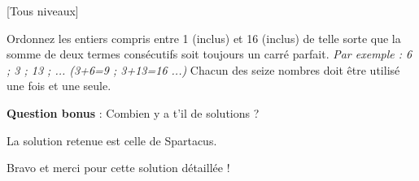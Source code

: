 
%
[Tous niveaux]

\begin{center}
\end{center}

Ordonnez les entiers compris entre 1 (inclus) et 16 (inclus) de telle sorte que la somme de deux termes consécutifs soit toujours un carré parfait.
\textit{Par exemple : 6 ; 3 ; 13 ; ... (3+6=9 ; 3+13=16 ...)}
Chacun des seize nombres doit être utilisé une fois et une seule.
\par
\textbf{Question bonus} : Combien y a t'il de solutions ?

\begin{solution}
     La solution retenue est celle de Spartacus. 
\par
Bravo et merci pour cette solution détaillée !
     \par
{}%

\end{solution}

